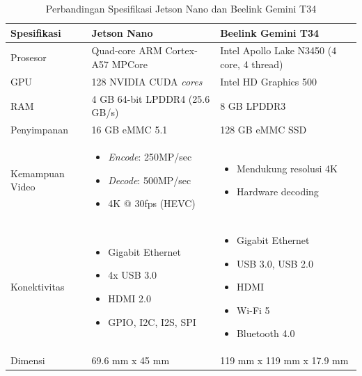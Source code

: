 \begin{table}[htbp]
  \centering
  \caption{Perbandingan Spesifikasi Jetson Nano dan Beelink Gemini T34}
  \label{tab:perbandingan_edge_device}
  \begin{tabular}{|p{3cm}|p{5cm}|p{5cm}|}
    \hline
    \textbf{Spesifikasi} & \textbf{Jetson Nano} & \textbf{Beelink Gemini T34} \\
    \hline
    Prosesor & Quad-core ARM Cortex-A57 MPCore & Intel Apollo Lake N3450 (4 core, 4 thread) \\
    \hline
    GPU & 128 NVIDIA CUDA \emph{cores} & Intel HD Graphics 500 \\
    \hline
    RAM & 4 GB 64-bit LPDDR4 (25.6 GB/s) & 8 GB LPDDR3 \\
    \hline
    Penyimpanan & 16 GB eMMC 5.1 & 128 GB eMMC SSD \\
    \hline
    Kemampuan Video & \begin{itemize}[nolistsep]
      \item \emph{Encode}: 250MP/sec
      \item \emph{Decode}: 500MP/sec
      \item 4K @ 30fps (HEVC)
    \end{itemize} & \begin{itemize}[nolistsep]
      \item Mendukung resolusi 4K
      \item Hardware decoding
    \end{itemize} \\
    \hline
    Konektivitas & \begin{itemize}[nolistsep]
      \item Gigabit Ethernet
      \item 4x USB 3.0
      \item HDMI 2.0
      \item GPIO, I2C, I2S, SPI
    \end{itemize} & \begin{itemize}[nolistsep]
      \item Gigabit Ethernet
      \item USB 3.0, USB 2.0
      \item HDMI
      \item Wi-Fi 5
      \item Bluetooth 4.0
    \end{itemize} \\
    \hline
    Dimensi & 69.6 mm x 45 mm & 119 mm x 119 mm x 17.9 mm \\
    \hline

\end{tabular}
\end{table}
